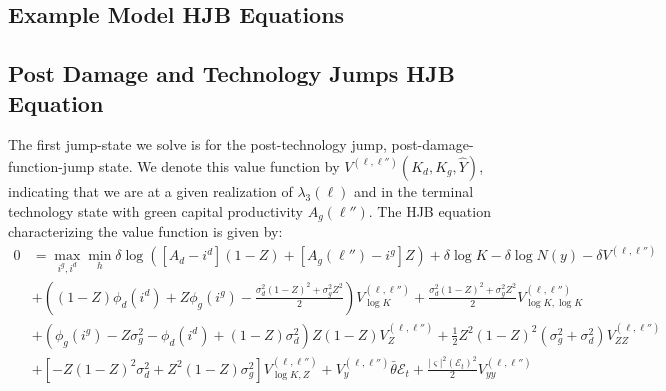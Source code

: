 \documentclass[12pt]{article}
\begin{document}
\begin{appendices}

\onehalfspacing




\section{Example Model HJB Equations}\label{app:PartialHJB}


\subsection{Post Damage and Technology Jumps HJB Equation}

The first jump-state we solve is for the post-technology jump, post-damage-function-jump state. We denote this value function by $V^{(\ell,\ell'')}(K_{d},K_{g},\hat{Y})$, indicating that we are at a given realization of $\lambda_3(\ell)$ and in the terminal technology state with green capital productivity $A_g(\ell'')$. The HJB equation characterizing the value function is given by:
\begin{equation*}
\begin{split}
0 & = \max_{i^{g},i^{d}} \min_{h} \delta\log([A_{d}-i^{d}](1-Z)+[A_{g}(\ell'')-i^{g}]Z) + \delta\log K - \delta \log N(y) - \delta V^{(\ell,\ell'')}\\
 & + \left((1-Z) \phi_d(i^{d}) +Z \phi_g(i^{g}) - \frac{   \sigma_d^2 (1-Z)^2 + \sigma_g^2 Z^2 }{2} \right)V^{(\ell,\ell'')}_{\log K} + \frac{  \sigma_d^2 (1-Z)^2 + \sigma_g^2 Z^2}{2} V^{(\ell,\ell'')}_{\log K,  \log K}  \\
 & +\left( \phi_g(i^{g}) - Z \sigma_g^2 - \phi_d(i^{d}) + (1-Z) \sigma_d^2  \right) Z (1-Z) V^{(\ell,\ell'')}_{Z} + \frac{1}{2} Z^2 (1-Z)^2 ({ \sigma_g^2 + \sigma_d^2} ) V^{(\ell,\ell'')}_{ZZ} \\
  & + \left[-Z(1-Z)^2\sigma_d^2 + Z^2(1-Z)\sigma_g^2\right]V^{(\ell,\ell'')}_{\log K, Z} + V^{(\ell,\ell'')}_{y} \bar{\theta}  \mathcal{E}_t +\frac{|\varsigma|^{2}(\mathcal{E}_t)^{2}}{2} V^{(\ell,\ell'')}_{yy} %
\end{split}
\end{equation*}


\end{appendices}
\end{document}
